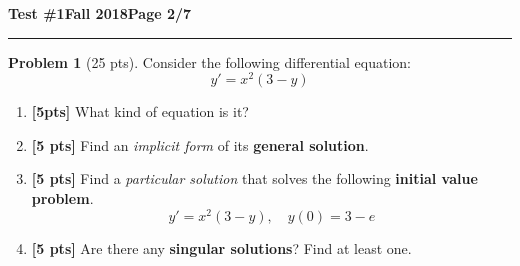 \documentclass[12pt]{article}
\theoremstyle{definition}
\newtheorem{problem}{Problem}
\begin{document}
\hfill{\large\bf Test \#1}\hfill{\large\bf Fall 2018}\hfill{\large\bf Page 2/7}\hrule 

\bigskip

\begin{problem}[25 pts]
  Consider the following differential equation:
  \begin{equation*}
    y' = x^2 (3-y)
  \end{equation*}
  \begin{enumerate}
  \item \textbf{[5pts]} What kind of equation is it?
    \begin{flushright}
    \end{flushright}
  \item \textbf{[5 pts]} Find an \emph{implicit form} of its \textbf{general solution}.
    \vspace{4.25cm}
    \begin{flushright}
    \end{flushright}  
  \item \textbf{[5 pts]} Find a \emph{particular solution} that solves the following \textbf{initial value problem}.
    \begin{equation*}
      y' = x^2 (3-y), \quad y(0) = 3-e
    \end{equation*}
    \begin{flushright}
    \end{flushright}
  \item \textbf{[5 pts]} Are there any \textbf{singular solutions}?  Find at least one.
    \begin{flushright}
    \end{flushright}

\end{enumerate}
\end{problem}
\end{document}
